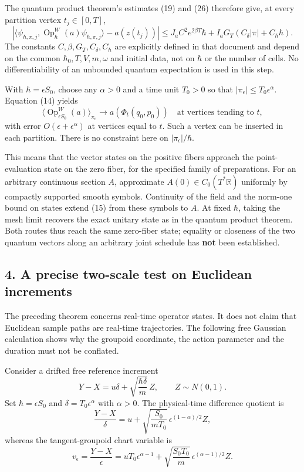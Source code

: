 \documentclass[11pt,a4paper]{article}
\begin{document}
The quantum product theorem's estimates (19) and (26) therefore give, at
every partition vertex \(t_j\in[0,T]\), \[
 \left|\langle\psi_{\hbar,\pi,j},\operatorname{Op}_\hbar^W(a)
                         \psi_{\hbar,\pi,j}\rangle-a(z(t_j))\right|
 \le J_a C^2 e^{2\beta T}\hbar+
 I_aG_T(C_\delta|\pi|+C_\hbar\hbar).\tag{14}
\] The constants \(C,\beta,G_T,C_\delta,C_\hbar\) are explicitly defined
in that document and depend on the common \(\hbar_0,T,V,m,\omega\) and
initial data, not on \(\hbar\) or the number of cells. No
differentiability of an unbounded quantum expectation is used in this
step.

With \(\hbar=\epsilon S_0\), choose any \(\alpha>0\) and a time unit
\(T_0>0\) so that \(|\pi_\epsilon|\le T_0\epsilon^\alpha\). Equation
(14) yields \[
 \langle\operatorname{Op}_{\epsilon S_0}^W(a)\rangle_{\pi_\epsilon}
 \longrightarrow a(\Phi_t(q_0,p_0))
 \quad\text{at vertices tending to }t,\tag{15}
\] with error \(O(\epsilon+\epsilon^\alpha)\) at vertices equal to
\(t\). Such a vertex can be inserted in each partition. There is no
constraint here on \(|\pi_\epsilon|/\hbar\).

This means that the vector states on the positive fibers approach the
point-evaluation state on the zero fiber, for the specified family of
preparations. For an arbitrary continuous section \(A\), approximate
\(A(0)\in C_0(T^*\mathbb R)\) uniformly by compactly supported smooth
symbols. Continuity of the field and the norm-one bound on states extend
(15) from these symbols to \(A\). At fixed \(\hbar\), taking the mesh
limit recovers the exact unitary state as in the quantum product
theorem. Both routes thus reach the same zero-fiber state; equality or
closeness of the two quantum vectors along an arbitrary joint schedule
has \textbf{not} been established.

\subsection{4. A precise two-scale test on Euclidean
increments}\label{a-precise-two-scale-test-on-euclidean-increments}

The preceding theorem concerns real-time operator states. It does not
claim that Euclidean sample paths are real-time trajectories. The
following free Gaussian calculation shows why the groupoid coordinate,
the action parameter and the duration must not be conflated.

Consider a drifted free reference increment
\[Y-X=u\delta+\sqrt{\frac{\hbar\delta}{m}}\,Z,
 \qquad Z\sim N(0,1).\tag{16}\] Set \(\hbar=\epsilon S_0\) and
\(\delta=T_0\epsilon^\alpha\) with \(\alpha>0\). The physical-time
difference quotient is \[\frac{Y-X}{\delta}
 =u+\sqrt{\frac{S_0}{mT_0}}\,
       \epsilon^{(1-\alpha)/2}Z,\tag{17}\] whereas the tangent-groupoid
chart variable is \[v_\epsilon=\frac{Y-X}{\epsilon}
 =uT_0\epsilon^{\alpha-1}
  +\sqrt{\frac{S_0T_0}{m}}\,
       \epsilon^{(\alpha-1)/2}Z.\tag{18}\]
\end{document}
